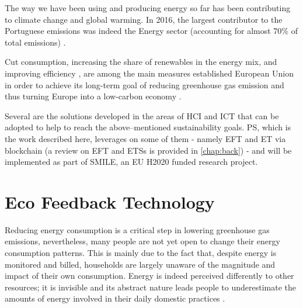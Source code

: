 \label{chap:intro}
\cleardoublepage
The way we have been using and producing energy so far has been contributing to climate change and global warming. In 2016, the largest contributor to the Portuguese emissions was indeed the Energy sector (accounting for almost 70\% of total emissions)\cite{NacionalReport} .


Cut consumption, increasing the share of renewables in the energy mix, and improving efficiency \cite{Europa1, Europa2, Europa3}, are among the main measures established European Union in order to achieve its long-term goal of reducing greenhouse gas emission and thus turning Europe into a low-carbon economy \cite{Europa2050}.


Several are the solutions developed in the areas of \ac{HCI} and \ac{ICT} that can be adopted to help to reach the above--mentioned sustainability goals. \ac{PS}, which is the work described here, leverages on some of them - namely \ac{EFT} and \ac{ET} via blockchain (a review on \ac{EFT} and \acp{ETS} is provided in \cref{chap:back}) - and will be implemented as part of \ac{SMILE}, an EU H2020 funded research project.




\section{Eco Feedback Technology}

Reducing energy consumption is a critical step in lowering greenhouse gas emissions, nevertheless, many people are not yet open to change their energy consumption patterns. This is mainly due to the fact that, despite energy is monitored and billed, households are largely unaware of the magnitude and impact of their own consumption. Energy is indeed perceived differently to other resources; it is invisible and its abstract nature leads people to underestimate the amounts of energy involved in their daily domestic practices \cite{ReducingDomesticEnergy}.


